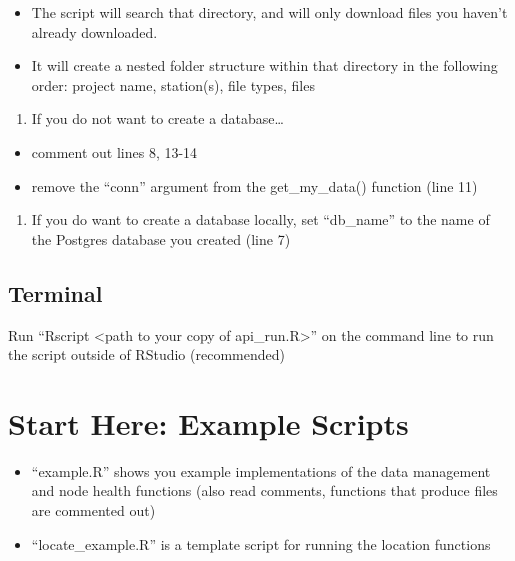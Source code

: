 \documentclass[
]{book}
\providecommand{\tightlist}{%
  \setlength{\itemsep}{0pt}\setlength{\parskip}{0pt}}
\begin{document}
\begin{itemize}
\tightlist
\item
  The script will search that directory, and will only download files you haven't already downloaded.
\item
  It will create a nested folder structure within that directory in the following order: project name, station(s), file types, files
\end{itemize}

\begin{enumerate}
\def\labelenumi{\arabic{enumi}.}
\setcounter{enumi}{3}
\tightlist
\item
  If you do not want to create a database\ldots{}
\end{enumerate}

\begin{itemize}
\tightlist
\item
  comment out lines 8, 13-14
\item
  remove the ``conn'' argument from the get\_my\_data() function (line 11)
\end{itemize}

\begin{enumerate}
\def\labelenumi{\arabic{enumi}.}
\setcounter{enumi}{4}
\tightlist
\item
  If you do want to create a database locally, set ``db\_name'' to the name of the Postgres database you created (line 7)
\end{enumerate}

\hypertarget{terminal}{%
\section{Terminal}\label{terminal}}

Run ``Rscript \textless path to your copy of api\_run.R\textgreater{}'' on the command line to run the script outside of RStudio (recommended)

\hypertarget{start-here-example-scripts}{%
\chapter{Start Here: Example Scripts}\label{start-here-example-scripts}}

\begin{itemize}
\tightlist
\item
  ``example.R'' shows you example implementations of the data management and node health functions (also read comments, functions that produce files are commented out)
\item
  ``locate\_example.R'' is a template script for running the location functions
\end{itemize}
\end{document}
